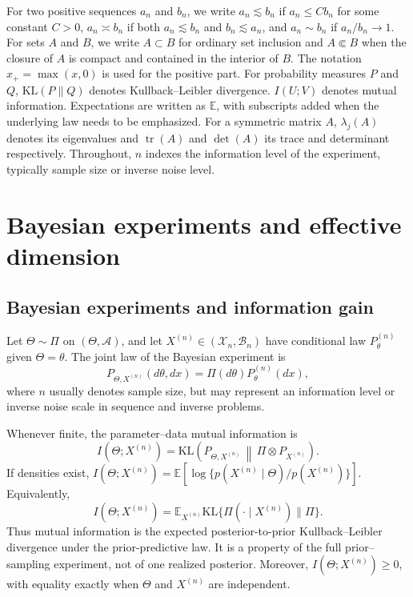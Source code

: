 \documentclass[11pt]{article}
\theoremstyle{plain}
\theoremstyle{definition}
\theoremstyle{remark}
\newcommand{\E}{\mathbb{E}}
\newcommand{\KL}{\mathrm{KL}}
\begin{document}
For two positive sequences \(a_n\) and \(b_n\), we write \(a_n\lesssim b_n\) if \(a_n\leq Cb_n\) for some constant \(C>0\), \(a_n\asymp b_n\) if both \(a_n\lesssim b_n\) and \(b_n\lesssim a_n\), and \(a_n\sim b_n\) if \(a_n/b_n\to1\). For sets $A$ and $B$, we write \(A\subset B\) for ordinary set inclusion and \(A\Subset B\) when the closure of \(A\) is compact and contained in the interior of \(B\). The notation \(x_+=\max(x,0)\) is used for the positive part. For probability measures \(P\) and \(Q\), \(\KL(P\|Q)\) denotes Kullback--Leibler divergence. \(I(U;V)\) denotes mutual information. Expectations are written as \(\E\), with subscripts added when the underlying law needs to be emphasized. For a symmetric matrix \(A\), \(\lambda_j(A)\) denotes its eigenvalues and \(\operatorname{tr}(A)\) and \(\det(A)\) its trace and determinant respectively. Throughout, \(n\) indexes the information level of the experiment, typically sample size or inverse noise level.	

\section{Bayesian experiments and effective dimension}
\label{sec:effective-dimension}

\subsection{Bayesian experiments and information gain}
\label{subsec:bayes-experiment}

Let $\Theta\sim\Pi$ on $(\mathsf{\Theta},\mathcal A)$, and let $X^{(n)}\in(\mathcal X_n,\mathcal B_n)$ have conditional law $P_\theta^{(n)}$ given $\Theta=\theta$. The joint law of the Bayesian experiment is
\[
P_{\Theta,X^{(n)}}(d\theta,dx)=\Pi(d\theta)P_\theta^{(n)}(dx),
\]
where $n$ usually denotes sample size, but may represent an information level or inverse noise scale in sequence and inverse problems.

Whenever finite, the parameter--data mutual information is
\begin{equation*}
	I(\Theta;X^{(n)})
	=
	\KL\!\left(
	P_{\Theta,X^{(n)}}\,\middle\|\,\Pi\otimes P_{X^{(n)}}
	\right).
\end{equation*}
If densities exist, $I(\Theta;X^{(n)})=\E[\log\{p(X^{(n)}\mid\Theta)/p(X^{(n)})\}]$. Equivalently,
\begin{equation*}
	I(\Theta;X^{(n)})
	=
	\E_{X^{(n)}}
	\KL\{\Pi(\cdot\mid X^{(n)})\|\Pi\}.
\end{equation*}
Thus mutual information is the expected posterior-to-prior Kullback--Leibler divergence under the prior-predictive law. It is a property of the full prior--sampling experiment, not of one realized posterior. Moreover, $I(\Theta;X^{(n)})\geq0$, with equality exactly when $\Theta$ and $X^{(n)}$ are independent.
\end{document}
